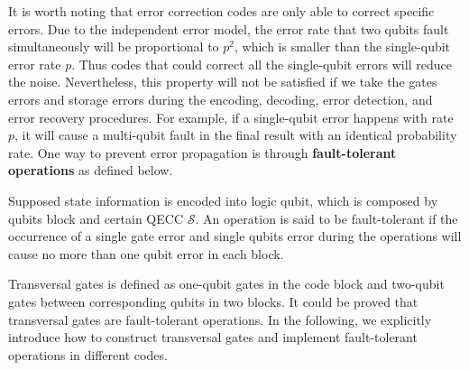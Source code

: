\documentclass[11pt]{article}
\begin{document}
It is worth noting that error correction codes are only able to correct specific errors. Due to the independent error model, the error rate that two qubits fault simultaneously will be proportional to $p^2$, which is smaller than the single-qubit error rate $p$. Thus codes that could correct all the single-qubit errors will reduce the noise. Nevertheless, this property will not be satisfied if we take the gates errors and storage errors during the encoding, decoding, error detection, and error recovery procedures. For example, if a single-qubit error happens with rate $p$, it will cause a multi-qubit fault in the final result with an identical probability rate. One way to prevent error propagation is through \textbf{fault-tolerant operations} as defined below.
\begin{definition}
    Supposed state information is encoded into logic qubit, which is composed by qubits block and certain QECC $\mathcal{S}$. An operation is said to be fault-tolerant if the occurrence of a single gate error and single qubits error during the operations will cause no more than one qubit error in each block.  
\end{definition}
Transversal gates is defined as one-qubit gates in the code block and two-qubit gates between corresponding qubits in two blocks.  It could be proved that transversal gates are fault-tolerant operations. In the following, we explicitly introduce how to construct transversal gates and implement fault-tolerant operations in different codes.
\end{document}
